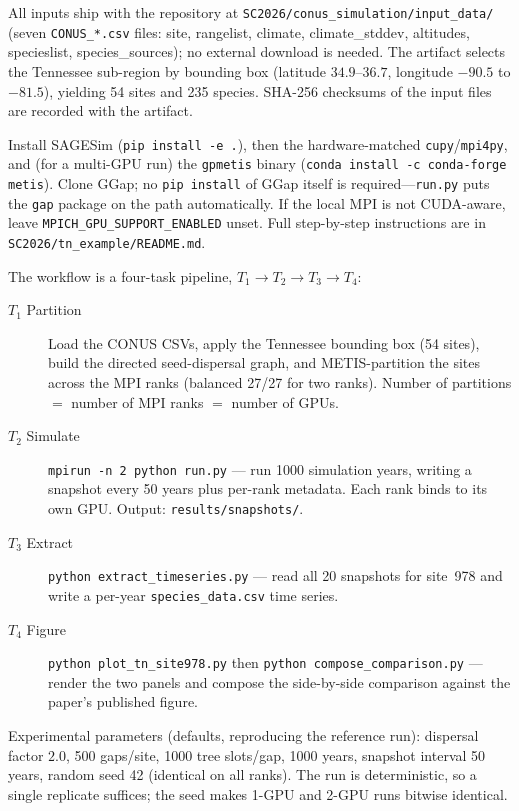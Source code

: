 \documentclass[conference]{IEEEtran}
\begin{document}

All inputs ship with the repository at
\texttt{SC2026/conus\_simulation/input\_data/} (seven \texttt{CONUS\_*.csv} files:
site, rangelist, climate, climate\_stddev, altitudes, specieslist, species\_sources); no
external download is needed. The artifact selects the Tennessee sub-region by bounding
box (latitude $34.9$--$36.7$, longitude $-90.5$ to $-81.5$), yielding 54 sites and 235
species. SHA-256 checksums of the input files are recorded with the artifact.


Install SAGESim (\texttt{pip install -e .}), then the hardware-matched
\texttt{cupy}/\texttt{mpi4py}, and (for a multi-GPU run) the \texttt{gpmetis} binary
(\texttt{conda install -c conda-forge metis}). Clone GGap; no \texttt{pip install} of
GGap itself is required---\texttt{run.py} puts the \texttt{gap} package on the path
automatically. If the local MPI is not CUDA-aware, leave
\texttt{MPICH\_GPU\_SUPPORT\_ENABLED} unset. Full step-by-step instructions are in
\texttt{SC2026/tn\_example/README.md}.

\artcomp

The workflow is a four-task pipeline, $T_1 \rightarrow T_2 \rightarrow T_3 \rightarrow T_4$:
\begin{description}
\item[$T_1$ Partition] Load the CONUS CSVs, apply the Tennessee bounding box (54 sites),
  build the directed seed-dispersal graph, and METIS-partition the sites across the MPI
  ranks (balanced 27/27 for two ranks). Number of partitions $=$ number of MPI ranks
  $=$ number of GPUs.
\item[$T_2$ Simulate] \texttt{mpirun -n 2 python run.py} --- run 1000 simulation years,
  writing a snapshot every 50 years plus per-rank metadata. Each rank binds to its own
  GPU. Output: \texttt{results/snapshots/}.
\item[$T_3$ Extract] \texttt{python extract\_timeseries.py} --- read all 20 snapshots for
  site~978 and write a per-year \texttt{species\_data.csv} time series.
\item[$T_4$ Figure] \texttt{python plot\_tn\_site978.py} then
  \texttt{python compose\_comparison.py} --- render the two panels and compose the
  side-by-side comparison against the paper's published figure.
\end{description}
Experimental parameters (defaults, reproducing the reference run): dispersal factor
$2.0$, 500 gaps/site, 1000 tree slots/gap, 1000 years, snapshot interval 50 years,
random seed 42 (identical on all ranks). The run is deterministic, so a single
replicate suffices; the seed makes 1-GPU and 2-GPU runs bitwise identical.
\end{document}
